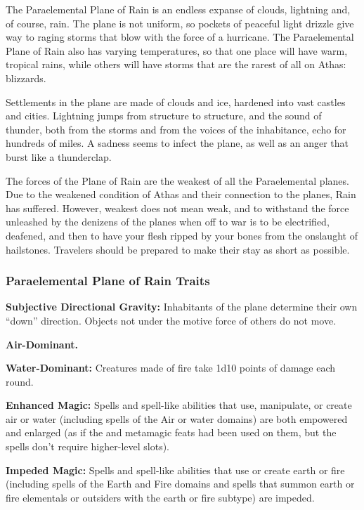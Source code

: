 The Paraelemental Plane of Rain is an endless expanse of clouds, lightning and, of course, rain. The plane is not uniform, so pockets of peaceful light drizzle give way to raging storms that blow with the force of a hurricane. The Paraelemental Plane of Rain also has varying temperatures, so that one place will have warm, tropical rains, while others will have storms that are the rarest of all on Athas: blizzards.

Settlements in the plane are made of clouds and ice, hardened into vast castles and cities. Lightning jumps from structure to structure, and the sound of thunder, both from the storms and from the voices of the inhabitance, echo for hundreds of miles. A sadness seems to infect the plane, as well as an anger that burst like a thunderclap.

The forces of the Plane of Rain are the weakest of all the Paraelemental planes. Due to the weakened condition of Athas and their connection to the planes, Rain has suffered. However, weakest does not mean weak, and to withstand the force unleashed by the denizens of the planes when off to war is to be electrified, deafened, and then to have your flesh ripped by your bones from the onslaught of hailstones. Travelers should be prepared to make their stay as short as possible.

\subsubsection{Paraelemental Plane of Rain Traits}
\begin{itemize*}
\item \textbf{Subjective Directional Gravity:} Inhabitants of the plane determine their own ``down'' direction. Objects not under the motive force of others do not move.
\item \textbf{Air-Dominant.}
\item \textbf{Water-Dominant:} Creatures made of fire take 1d10 points of damage each round.
\item \textbf{Enhanced Magic:} Spells and spell-like abilities that use, manipulate, or create air or water (including spells of the Air or water domains) are both empowered and enlarged (as if the  and  metamagic feats had been used on them, but the spells don't require higher-level slots).
\item \textbf{Impeded Magic:} Spells and spell-like abilities that use or create earth or fire (including spells of the Earth and Fire domains and spells that summon earth or fire elementals or outsiders with the earth or fire subtype) are impeded.
\end{itemize*}
